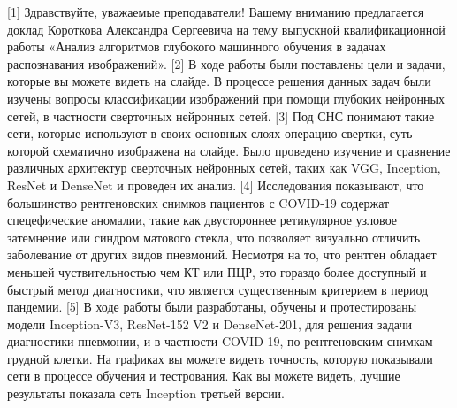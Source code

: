[1]
Здравствуйте, уважаемые преподаватели!
Вашему вниманию предлагается доклад Короткова Александра Сергеевича на тему выпускной квалификационной работы «Анализ алгоритмов глубокого машинного обучения  в задачах распознавания изображений».
[2]
В ходе работы были поставлены цели и задачи, которые вы можете видеть на слайде.
В процессе решения данных задач были изучены вопросы классификации изображений при помощи глубоких нейронных сетей, в частности сверточных нейронных сетей. 
[3]
Под СНС понимают такие сети, которые используют в своих основных слоях операцию свертки, суть которой схематично изображена на слайде. Было проведено изучение и сравнение различных архитектур сверточных нейронных сетей, таких как VGG, Inception, ResNet и DenseNet и проведен их анализ.   
[4]
Исследования показывают, что большинство рентгеновских снимков пациентов с COVID-19 содержат спецефические аномалии, такие как двустороннее ретикулярное узловое затемнение или синдром матового стекла, что позволяет визуально отличить заболевание от других видов пневмоний. Несмотря на то, что рентген обладает меньшей чуствительностью чем КТ или ПЦР, это гораздо более доступный и быстрый метод диагностики, что является существенным критерием в период пандемии.
[5]
В ходе работы были разработаны, обучены и протестированы модели Inception-V3, ResNet-152 V2 и DenseNet-201, для решения задачи диагностики пневмонии, и в частности COVID-19, по рентгеновским снимкам грудной клетки. На графиках вы можете видеть точность, которую показывали сети в процессе обучения и тестрования. Как вы можете видеть, лучшие результаты показала сеть Inception третьей версии.



\\\\

